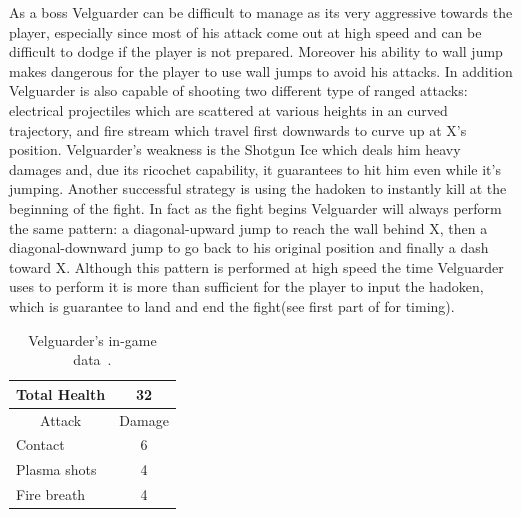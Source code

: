 As a boss Velguarder can be difficult to manage as its very aggressive towards the player, especially since most of his attack come out at high speed and can be difficult to dodge if the player is not prepared. Moreover his ability to wall jump makes dangerous for the player to use wall jumps to avoid his attacks. In addition Velguarder is also capable of shooting two different type of ranged attacks: electrical projectiles which are scattered at various heights in an curved trajectory, and fire stream which travel first downwards to curve up at X's position. Velguarder's weakness is the Shotgun Ice which deals him heavy damages and, due its ricochet capability, it guarantees to hit him even while it's jumping. Another successful strategy is using the hadoken to instantly kill at the beginning of the fight. In fact as the fight begins Velguarder will always perform the same pattern: a diagonal-upward jump to reach the wall behind X, then a diagonal-downward jump to go back to his original position and finally a dash toward X. Although this pattern is performed at high speed the time Velguarder uses to perform it is more than sufficient for the player to input the hadoken, which is guarantee to land and end the fight(see first part of  for timing).

\begin{table}
	\centering
	\begin{tabular}[h]{l c}
		\toprule
		Total Health  & 32\\
		\midrule
		\multicolumn{1}{c}{Attack} & \multicolumn{1}{c}{Damage}\\
		Contact & 6\\
		Plasma shots& 4\\
		Fire breath& 4\\
		\bottomrule
	\end{tabular}
	\caption{Velguarder's in-game data~\cite{wiki:Velguarder}.}
\end{table}

